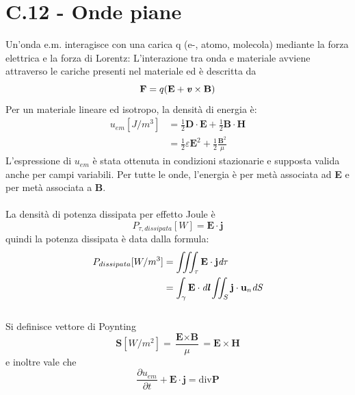 \documentclass{article}
\begin{document}
\section*{C.12 - Onde piane}
Un’onda e.m. interagisce con una carica q (e-, atomo, molecola) mediante la forza elettrica e la forza di Lorentz:
L’interazione tra onda e materiale avviene attraverso le cariche presenti nel materiale ed è descritta da
\begin{equation}
    \textbf{F}=q(\textbf{E}+\textbf{\emph{v}}\times\textbf{B})
    \nonumber
\end{equation}
Per un materiale lineare ed isotropo, la densità di energia è:
\begin{equation}
\begin{split}
    u_{em} [J/m^3] &=\frac{1}{2}\textbf{D}\cdot\textbf{E}+\frac{1}{2}\textbf{B}\cdot\textbf{H} \\
    &=\frac{1}{2}\varepsilon\textbf{E}^2+\frac{1}{2}\frac{\textbf{B}^2}{\mu}
    \nonumber
\end{split}
\end{equation}
L'espressione di $u_{em}$ è stata ottenuta in condizioni stazionarie e supposta valida anche per campi variabili. Per tutte le onde, l’energia è per metà associata ad \textbf{E} e per metà associata a \textbf{B}.\\
\\
La densità di potenza dissipata per effetto Joule è
\begin{equation}
    P_{\tau ,dissipata}[W] = \textbf{E}\cdot\textbf{j}
    \nonumber
\end{equation}
quindi la potenza dissipata è data dalla formula:
\begin{equation}
    \begin{split}
    P_{dissipata}[W/m^3] &= \iiint_\tau \textbf{E}\cdot\textbf{j}\emph{d}\tau \\
    &= \int_\gamma \textbf{E}\cdot\emph{d\textbf{l}} \iint_S \textbf{j}\cdot\textbf{u}_n\emph{dS}
    \nonumber
    \end{split}
\end{equation}
\\
Si definisce vettore di Poynting 
\begin{equation}
\textbf{S}[W/m^2] = \frac{\textbf{E} \times \textbf{B}}{\mu} = \textbf{E} \times \textbf{H}
\end{equation}
e inoltre vale che
\begin{equation}
\frac{\partial u_{em}}{\partial t} + \textbf{E} \cdot \textbf{j} = \text{div}\textbf{P}
\nonumber
\end{equation}
\end{document}
